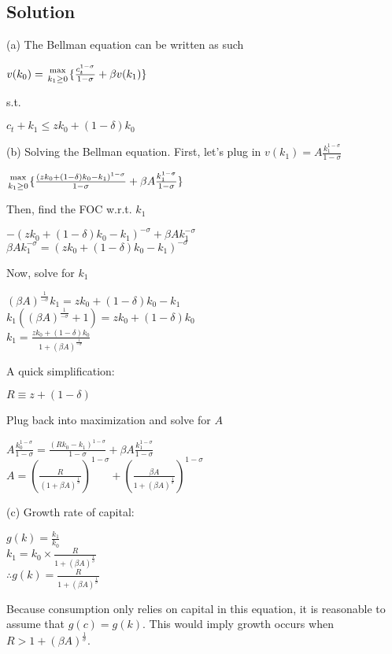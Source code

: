 \documentclass[10pt, a4paper]{article}
\begin{document}
  \subsection*{Solution}
    (a) The Bellman equation can be written as such
    \begin{center}
      $v(k_0)={\max\atop{k_1\geq0}}\{\frac{c_t^{1-\sigma}}{1-\sigma}+\beta v(k_1)\}$ \\
    \end{center}
    s.t.
    \begin{center}
      $c_t + k_1 \leq zk_0+(1-\delta)k_0$ \\
    \end{center}
    (b) Solving the Bellman equation. First, let's plug in $v(k_1) = A\frac{k_1^{1-\sigma}}{1-\sigma}$
    \begin{center}
      ${\max\atop{k_1\geq0}}\{\frac{(zk_0+(1-\delta)k_0-k_1)^{1-\sigma}}{1-\sigma}+\beta A\frac{k_1^{1-\sigma}}{1-\sigma}\}$ \\
    \end{center}
    Then, find the FOC w.r.t. $k_1$
    \begin{center}
      $-(zk_0+(1-\delta)k_0-k_1)^{-\sigma}+\beta Ak_1^{-\sigma}$ \\
      $\beta Ak_1^{-\sigma}=(zk_0+(1-\delta)k_0-k_1)^{-\sigma}$ \\ 
    \end{center}
    Now, solve for $k_1$
    \begin{center}
      $(\beta A)^{\frac{1}{-\sigma}}k_1 = zk_0+(1-\delta)k_0-k_1$ \\
      $k_1((\beta A)^{\frac{1}{-\sigma}}+1)=zk_0+(1-\delta)k_0$ \\
      $k_1 = \frac{zk_0+(1-\delta)k_0}{1+(\beta A)^{\frac{1}{-\sigma}}}$ \\
    \end{center}
    A quick simplification:
    \begin{center}
      $R\equiv z+(1-\delta)$ \\
    \end{center}
    Plug back into maximization and solve for $A$
    \begin{center}
      $A\frac{k_0^{1-\sigma}}{1-\sigma}=\frac{(Rk_0-k_1)^{1-\sigma}}{1-\sigma}+\beta A\frac{k_1^{1-\sigma}}{1-\sigma}$ \\
      $A = (\frac{R}{(1+\beta A)^{\frac{1}{\sigma}}})^{1-\sigma}+(\frac{\beta A}{1+(\beta A)^{\frac{1}{\sigma}}})^{1-\sigma}$ \\
    \end{center}
    (c) Growth rate of capital:
    \begin{center}
      $g(k) = \frac{k_1}{k_0}$ \\
      $k_1 = k_0\times\frac{R}{1+(\beta A)^{\frac{1}{\sigma}}}$ \\
      $\therefore g(k) = \frac{R}{1+(\beta A)^{\frac{1}{\sigma}}}$ \\
    \end{center}
    Because consumption only relies on capital in this equation, it is reasonable to assume that $g(c)=g(k)$. This would imply growth occurs when $R>1+(\beta A)^{\frac{1}{\sigma}}$.
\end{document}

